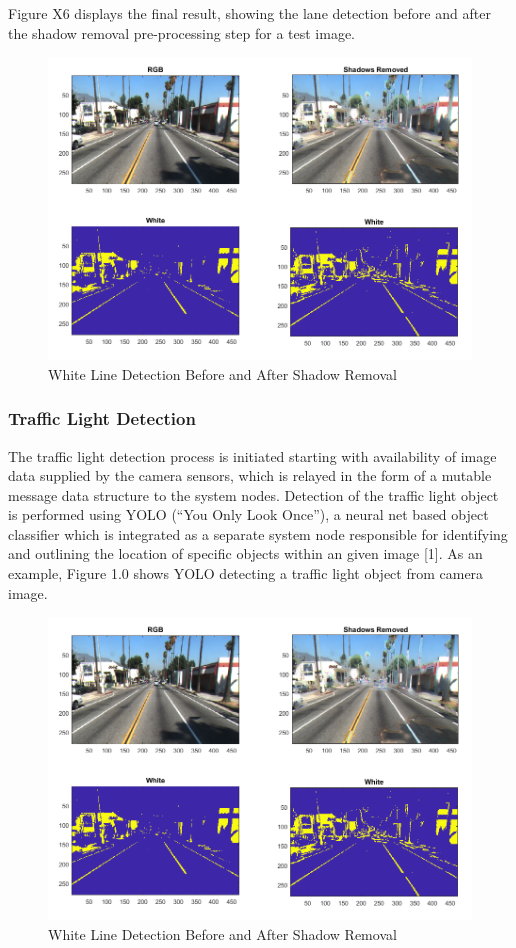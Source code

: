 \documentclass[11pt,journal]{IEEEtran}
\begin{document}
Figure X6 displays the final result, showing the lane detection before and after the shadow removal pre-processing step for a test image.

\begin{figure}[ht]
\centerline{\includegraphics[width=0.9\columnwidth]{X6.png}}
\caption{White Line Detection Before and After Shadow Removal}
\label{Shadow6}
\end{figure}

\subsubsection{Traffic Light Detection}
The traffic light detection process is initiated starting with availability of image data supplied by the camera sensors, which is relayed in the form of a mutable message data structure to the system nodes. Detection of the traffic light object is performed using YOLO (“You Only Look Once”), a neural net based object classifier which is integrated as a separate system node responsible for identifying and outlining the location of specific objects within an given image [1]. As an example, Figure 1.0 shows YOLO detecting a traffic light object from camera image.

\begin{figure}[ht]
\centerline{\includegraphics[width=0.9\columnwidth]{X6.png}}
\caption{White Line Detection Before and After Shadow Removal}
\label{TrafficLight}
\end{figure}
\end{document}
